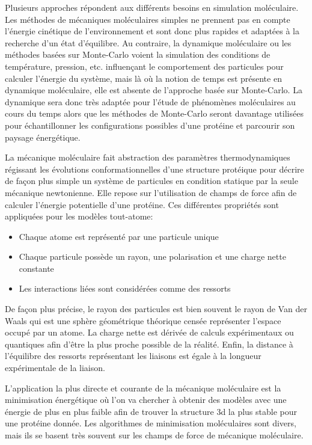 Plusieurs approches répondent aux différents besoins en simulation moléculaire. 
Les méthodes de mécaniques moléculaires simples ne prennent pas en compte l'énergie cinétique de l'environnement et sont donc plus rapides et adaptées à la recherche d'un état d'équilibre. Au contraire, la dynamique moléculaire ou les méthodes basées sur Monte-Carlo voient la simulation des conditions de température, pression, etc. influençant le comportement des particules pour calculer l'énergie du système, mais là où la notion de temps est présente en dynamique moléculaire, elle est absente de l'approche basée sur Monte-Carlo. La dynamique sera donc très adaptée pour l'étude de phénomènes moléculaires au cours du temps alors que les méthodes de Monte-Carlo seront davantage utilisées pour échantillonner les configurations possibles d'une protéine et parcourir son paysage énergétique.



La mécanique moléculaire fait abstraction des paramètres thermodynamiques régissant les évolutions conformationnelles d'une structure protéique pour décrire de façon plus simple un système de particules en condition statique par la seule mécanique newtonienne. Elle repose sur l'utilisation de champs de force afin de calculer l'énergie potentielle d'une protéine. Ces différentes propriétés sont appliquées pour les modèles tout-atome:

\begin{itemize}
  \item Chaque atome est représenté par une particule unique
  \item Chaque particule possède un rayon, une polarisation et une charge nette constante
  \item Les interactions liées sont considérées comme des ressorts 
\end{itemize}

De façon plus précise, le rayon des particules est bien souvent le rayon de Van der Waals qui est une sphère géométrique théorique censée représenter l'espace occupé par un atome. La charge nette est dérivée de calculs expérimentaux ou quantiques afin d'être la plus proche possible de la réalité. Enfin, la distance à l'équilibre des ressorts représentant les liaisons est égale à la longueur expérimentale de la liaison.

L'application la plus directe et courante de la mécanique moléculaire est la minimisation énergétique où l'on va chercher à obtenir des modèles avec une énergie de plus en plus faible afin de trouver la structure 3d la plus stable pour une protéine donnée. Les algorithmes de minimisation moléculaires sont divers, mais ils se basent très souvent sur les champs de force de mécanique moléculaire.

